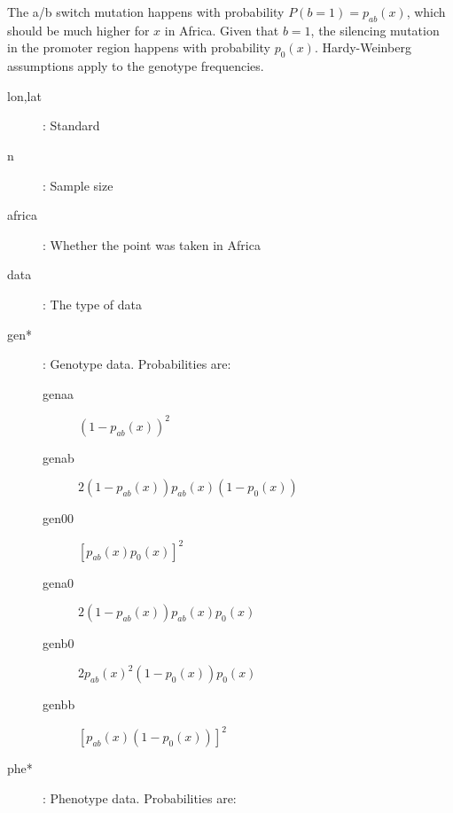\documentclass[a4paper]{article}
\begin{document}
The a/b switch mutation happens with probability $P(b=1)=p_{ab}(x)$, which should be much higher for $x$ in Africa. Given that $b=1$, the silencing mutation in the promoter region happens with probability $p_0(x)$. Hardy-Weinberg assumptions apply to the genotype frequencies.
\begin{description}
    \item[lon,lat]: Standard 
    \item[n]: Sample size
    \item[africa]: Whether the point was taken in Africa
    \item[data]: The type of data
    \item[gen*]: Genotype data. Probabilities are:
    \begin{description}
        \item[genaa] $(1-p_{ab}(x))^2$
        \item[genab] $2(1-p_{ab}(x))p_{ab}(x)(1-p_0(x))$ 
        \item[gen00] $[p_{ab}(x)p_0(x)]^2$
        \item[gena0] $2(1-p_{ab}(x))p_{ab}(x)p_0(x)$
        \item[genb0] $2p_{ab}(x)^2(1-p_0(x))p_0(x)$
        \item[genbb] $[p_{ab}(x)(1-p_0(x))]^2$
    \end{description}
    \item[phe*]: Phenotype data. Probabilities are:
    

\end{description}
\end{document}
